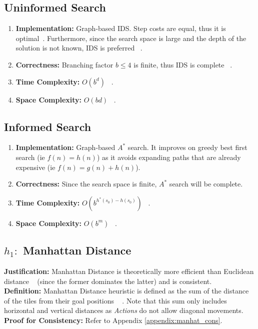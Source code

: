 \documentclass[runningheads]{llncs}
\begin{document}
\subsection{Uninformed Search}
\begin{enumerate}
    \item \textbf{Implementation:} Graph-based IDS. Step costs are equal, thus it is optimal~\cite[p88]{stuart_russell_artifical_2010}. Furthermore, since the search space is large and the depth of the solution is not known, IDS is preferred ~\cite[p90]{stuart_russell_artifical_2010}.
    \item \textbf{Correctness:} Branching factor \( b \leq 4 \) is finite, thus IDS is complete ~\cite[p88-90]{stuart_russell_artifical_2010}. 
    \item \textbf{Time Complexity:} \( O(b^d) \) ~\cite[p88-90]{stuart_russell_artifical_2010}.
    \item \textbf{Space Complexity:} \( O(bd) \) ~\cite[p88-90]{stuart_russell_artifical_2010}.
\end{enumerate}

\subsection{Informed Search}
\begin{enumerate}
    \item \textbf{Implementation:} Graph-based \( A^* \) search. It improves on greedy best first search (ie \( f(n) = h(n) \)) as it avoids expanding paths that are already expensive (ie \( f(n) = g(n) + h(n) \)).
    \item \textbf{Correctness:} Since the search space is finite, \( A^* \) search will be complete.
    \item \textbf{Time Complexity:} \( O(b^{h^*(s_0) - h(s_0)}) \) ~\cite[p93-99]{stuart_russell_artifical_2010}.
    \item \textbf{Space Complexity:} \( O(b^m) \) ~\cite[p93-99]{stuart_russell_artifical_2010}.
\end{enumerate}

\subsection{\(h_1:\) Manhattan Distance} 
\textbf{Justification:} Manhattan Distance is theoretically more efficient than Euclidean distance ~\cite[p104]{stuart_russell_artifical_2010} (since the former dominates the latter) and is consistent. \\
\textbf{Definition:} Manhattan Distance heuristic is defined as the sum of the distance of the tiles from their goal positions ~\cite[p103]{stuart_russell_artifical_2010} . Note that this sum only includes horizontal and vertical distances as \textit{Actions} do not allow diagonal movements. \\
\textbf{Proof for Consistency:} Refer to Appendix \ref{appendix:manhat_cons}.
\end{document}
